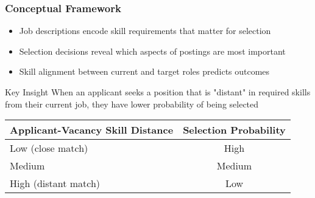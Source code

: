\documentclass[aspectratio=169]{beamer}
\begin{document}
\begin{frame}
\frametitle{Conceptual Framework}

\begin{itemize}
\item Job descriptions encode skill requirements that matter for selection
\item Selection decisions reveal which aspects of postings are most important
\item Skill alignment between current and target roles predicts outcomes
\end{itemize}

\begin{block}{Key Insight}
When an applicant seeks a position that is "distant" in required skills from their current job, they have lower probability of being selected
\end{block}

\begin{center}
\begin{tabular}{|l|c|}
\hline
\headrow
\textbf{Applicant-Vacancy Skill Distance} & \textbf{Selection Probability} \\
\hline
Low (close match) & High \\
Medium & Medium \\
High (distant match) & Low \\
\hline
\end{tabular}
\end{center}
\end{frame}

\end{document}
